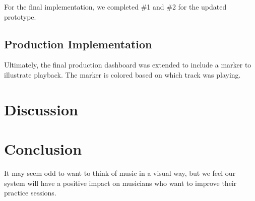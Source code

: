 \documentclass[journal]{vgtc}                %
\begin{document}
For the final implementation, we completed \#1 and \#2 for the updated prototype.

\subsection{Production Implementation}

Ultimately, the final production dashboard was extended to include a marker
to illustrate playback. The marker is colored based on which track was playing.

\section{Discussion}

\section{Conclusion}

It may seem odd to want to think of music in a visual way, but we feel our
system will have a positive impact on musicians who want to improve their
practice sessions.
\end{document}
